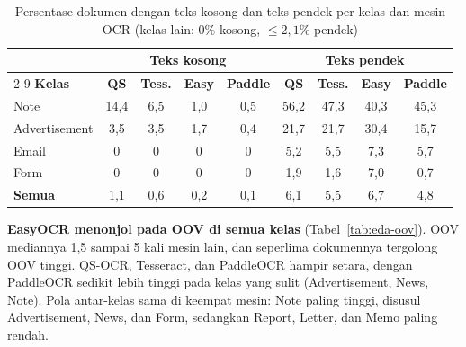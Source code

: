 \begin{table}[H]
  \centering
  \caption{Persentase dokumen dengan teks kosong dan teks pendek per kelas dan mesin OCR
  (kelas lain: 0\% kosong, $\leq 2{,}1$\% pendek)}
  \label{tab:eda-penanda}
  \fontsize{9}{11}\selectfont
  \setlength{\tabcolsep}{4pt}
  \begin{tabular}{|l|c|c|c|c|c|c|c|c|}
    \hline
    & \multicolumn{4}{c|}{\textbf{Teks kosong}} & \multicolumn{4}{c|}{\textbf{Teks pendek}} \\ \cline{2-9}
    \textbf{Kelas} & \textbf{QS} & \textbf{Tess.} & \textbf{Easy} & \textbf{Paddle} &
    \textbf{QS} & \textbf{Tess.} & \textbf{Easy} & \textbf{Paddle} \\ \hline
    Note & 14,4 & 6,5 & 1,0 & 0,5 & 56,2 & 47,3 & 40,3 & 45,3 \\ \hline
    Advertisement & 3,5 & 3,5 & 1,7 & 0,4 & 21,7 & 21,7 & 30,4 & 15,7 \\ \hline
    Email & 0 & 0 & 0 & 0 & 5,2 & 5,5 & 7,3 & 5,7 \\ \hline
    Form & 0 & 0 & 0 & 0 & 1,9 & 1,6 & 7,0 & 0,7 \\ \hline
    \textbf{Semua} & 1,1 & 0,6 & 0,2 & 0,1 & 6,1 & 5,5 & 6,7 & 4,8 \\ \hline
  \end{tabular}
\end{table}

\textbf{EasyOCR menonjol pada OOV di semua kelas} (Tabel~\ref{tab:eda-oov}). OOV
mediannya 1,5 sampai 5 kali mesin lain, dan seperlima dokumennya tergolong OOV tinggi.
QS-OCR, Tesseract, dan PaddleOCR hampir setara, dengan PaddleOCR sedikit lebih tinggi
pada kelas yang sulit (Advertisement, News, Note). Pola antar-kelas sama di keempat
mesin: Note paling tinggi, disusul Advertisement, News, dan Form, sedangkan Report,
Letter, dan Memo paling rendah.

